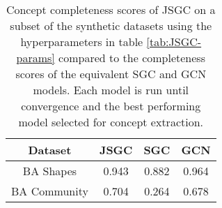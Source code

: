 \begin{table}[h]
    \centering
    \captionsetup{width=.9\textwidth}
    \begin{tabular}{c|c|cc}
        \textbf{Dataset} &
        \textbf{JSGC} &
        \textbf{SGC} &
        \textbf{GCN} \\
        \midrule
        BA Shapes       & 0.943 & 0.882 & 0.964 \\
        BA Community    & 0.704 & 0.264 & 0.678 \\
    \end{tabular}
    \caption{Concept completeness scores of JSGC on a subset of the synthetic datasets using the hyperparameters in table \ref{tab:JSGC-params} compared to the completeness scores of the equivalent SGC and GCN models. Each model is run until convergence and the best performing model selected for concept extraction.}
    \label{tab:JSGC-completeness}
\end{table}

